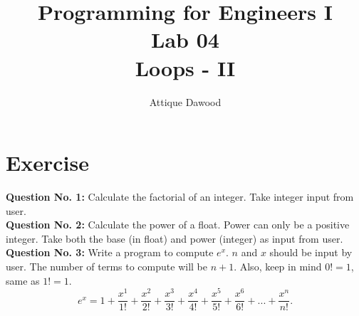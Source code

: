 \documentclass[12pt,a4paper]{article}
\title{Programming for Engineers I\\Lab 04\\Loops - II}
\author{Attique Dawood}
\begin{document}
\maketitle

\section{Exercise}
\textbf{Question No. 1:} Calculate the factorial of an integer. Take integer input from user.\\
\noindent\textbf{Question No. 2:} Calculate the power of a float. Power can only be a positive integer. Take both the base (in float) and power (integer) as input from user.\\
\noindent\textbf{Question No. 3:} Write a program to compute $e^x$. $n$ and $x$ should be input by user. The number of terms to compute will be $n+1$. Also, keep in mind $0! = 1$, same as $1! = 1$.
\begin{equation}
e^x = 1+\dfrac{x^1}{1!}+\dfrac{x^2}{2!}+\dfrac{x^3}{3!}+\dfrac{x^4}{4!}+\dfrac{x^5}{5!}+\dfrac{x^6}{6!}+...+\dfrac{x^n}{n!}.
\label{eq:ex-Taylor-Series}
\end{equation}
\end{document}
